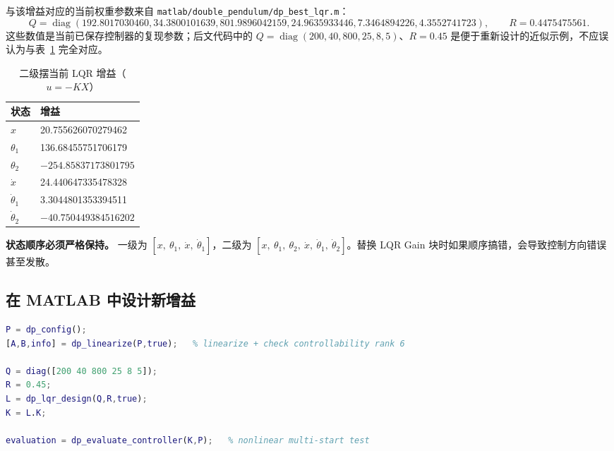 \documentclass[12pt,a4paper]{article}
\begin{document}
与该增益对应的当前权重参数来自 \texttt{matlab/double\_pendulum/dp\_best\_lqr.m}：
\[
Q=\operatorname{diag}\!\left(
192.8017030460,
34.3800101639,
801.9896042159,
24.9635933446,
7.3464894226,
4.3552741723
\right),
\qquad
R=0.4475475561.
\]
这些数值是当前已保存控制器的复现参数；后文代码中的 $Q=\operatorname{diag}(200,40,800,25,8,5)$、$R=0.45$ 是便于重新设计的近似示例，不应误认为与表~\ref{tab:K2} 完全对应。

\begin{table}[htbp]
    \centering
    \caption{二级摆当前 LQR 增益（$u = -KX$）}
    \label{tab:K2}
    \renewcommand{\arraystretch}{1.35}
    \begin{tabular}{@{}l l@{}}
        \toprule
        \textbf{状态} & \textbf{增益} \\
        \midrule
        $x$ & 20.755626070279462 \\
        $\theta_1$ & 136.68455751706179 \\
        $\theta_2$ & $-254.85837173801795$ \\
        $\dot{x}$ & 24.440647335478328 \\
        $\dot{\theta}_1$ & 3.3044801353394511 \\
        $\dot{\theta}_2$ & $-40.750449384516202$ \\
        \bottomrule
    \end{tabular}
\end{table}

\begin{dangerbox}
    \textbf{状态顺序必须严格保持。} 一级为 $[x,\ \theta_1,\ \dot{x},\ \dot{\theta}_1]$，二级为 $[x,\ \theta_1,\ \theta_2,\ \dot{x},\ \dot{\theta}_1,\ \dot{\theta}_2]$。替换 LQR Gain 块时如果顺序搞错，会导致控制方向错误甚至发散。
\end{dangerbox}

\subsection{在 MATLAB 中设计新增益}

\begin{lstlisting}[language=Matlab, caption={二级摆 LQR 设计与评估}, label={lst:lqrdesign}]
P = dp_config();
[A,B,info] = dp_linearize(P,true);   % linearize + check controllability rank 6

Q = diag([200 40 800 25 8 5]);
R = 0.45;
L = dp_lqr_design(Q,R,true);
K = L.K;

evaluation = dp_evaluate_controller(K,P);   % nonlinear multi-start test
\end{lstlisting}
\end{document}
